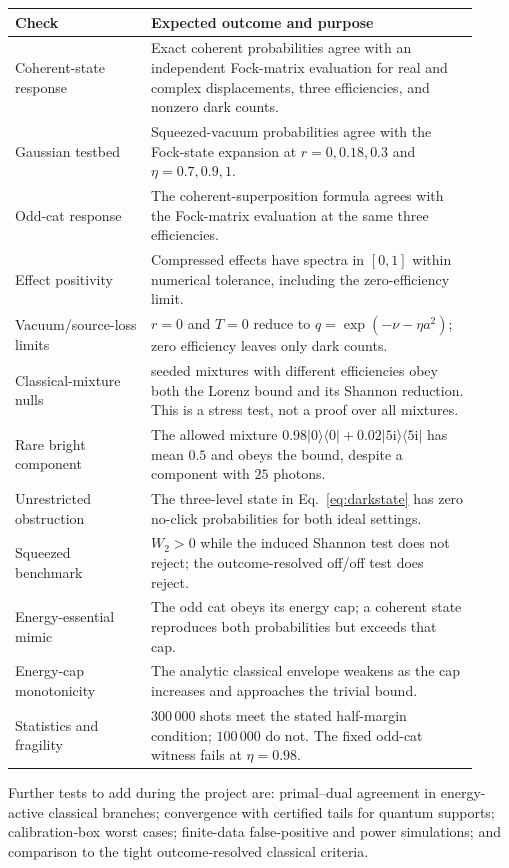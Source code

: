 \documentclass[11pt,a4paper]{article}
\newcommand{\ket}[1]{\lvert #1\rangle}
\newcommand{\bra}[1]{\langle #1\rvert}
\begin{document}
\begin{longtable}{>{\raggedright\arraybackslash}p{0.27\linewidth}>{\raggedright\arraybackslash}p{0.65\linewidth}}
\toprule
Check & Expected outcome and purpose\\
\midrule
\endhead
Coherent-state response & Exact coherent probabilities agree with an independent
Fock-matrix evaluation for real and complex displacements, three efficiencies,
and nonzero dark counts.\\
Gaussian testbed & Squeezed-vacuum probabilities agree with the Fock-state
expansion at $r=0,0.18,0.3$ and $\eta=0.7,0.9,1$.\\
Odd-cat response & The coherent-superposition formula agrees with the Fock-matrix
evaluation at the same three efficiencies.\\
Effect positivity & Compressed effects have spectra in $[0,1]$ within numerical
tolerance, including the zero-efficiency limit.\\
Vacuum/source-loss limits & $r=0$ and $T=0$ reduce to
$q=\exp(-\nu-\eta a^2)$; zero efficiency leaves only dark counts.\\
Classical-mixture nulls & 750 seeded mixtures with different efficiencies obey
both the Lorenz bound and its Shannon reduction. This is a stress test,
not a proof over all mixtures.\\
Rare bright component & The allowed mixture
$0.98\ket0\bra0+0.02\ket{5\mathrm i}\bra{5\mathrm i}$ has mean $0.5$
and obeys the bound, despite a component with $25$ photons.\\
Unrestricted obstruction & The three-level state in Eq.~\eqref{eq:darkstate}
has zero no-click probabilities for both ideal settings.\\
Squeezed benchmark & $W_2>0$ while the induced Shannon test does not reject;
the outcome-resolved off/off test does reject.\\
Energy-essential mimic & The odd cat obeys its energy cap; a coherent state
reproduces both probabilities but exceeds that cap.\\
Energy-cap monotonicity & The analytic classical envelope weakens as the cap
increases and approaches the trivial bound.\\
Statistics and fragility & $300\,000$ shots meet the stated half-margin
condition; $100\,000$ do not. The fixed odd-cat witness fails at $\eta=0.98$.\\
\bottomrule
\end{longtable}

Further tests to add during the project are: primal--dual agreement in
energy-active classical branches; convergence with certified tails for quantum
supports; calibration-box worst cases; finite-data false-positive and power
simulations; and comparison to the tight outcome-resolved classical criteria.
\end{document}
